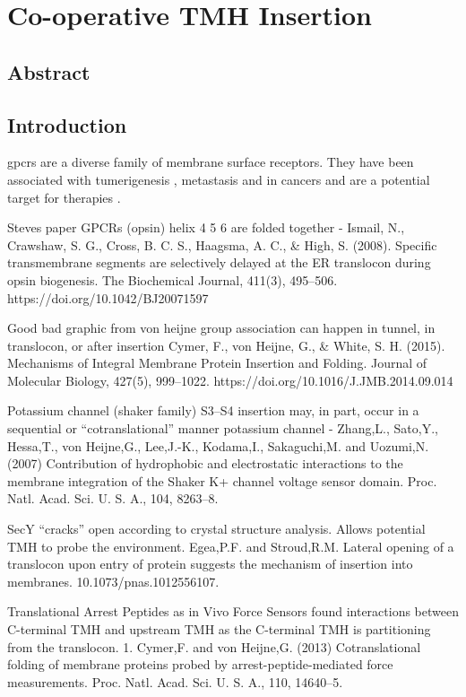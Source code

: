 
\chapter{Co-operative TMH Insertion}
\section{Abstract}
\section{Introduction}

\gls{gpcr}s are a diverse family of membrane surface receptors.
They have been associated with tumerigenesis \cite{OHayre2013}, metastasis \cite{Singh2015} and in cancers \cite{Bar-Shavit2016} and are a potential target for therapies \cite{Arakaki2018}.

Steves paper GPCRs (opsin) helix 4 5 6 are folded together - Ismail, N., Crawshaw, S. G., Cross, B. C. S., Haagsma, A. C., \& High, S. (2008). Specific transmembrane segments are selectively delayed at the ER translocon during opsin biogenesis. The Biochemical Journal, 411(3), 495–506. https://doi.org/10.1042/BJ20071597

Good bad graphic from von heijne group association can happen in tunnel, in translocon, or after insertion Cymer, F., von  Heijne, G., \& White, S. H. (2015). Mechanisms of Integral Membrane Protein Insertion and Folding. Journal of Molecular Biology, 427(5), 999–1022. https://doi.org/10.1016/J.JMB.2014.09.014

Potassium channel (shaker family) S3–S4 insertion may, in part, occur in a sequential or “cotranslational” manner potassium channel - Zhang,L., Sato,Y., Hessa,T., von Heijne,G., Lee,J.-K., Kodama,I., Sakaguchi,M. and Uozumi,N. (2007) Contribution of hydrophobic and electrostatic interactions to the membrane integration of the Shaker K+ channel voltage sensor domain. Proc. Natl. Acad. Sci. U. S. A., 104, 8263–8.

SecY “cracks” open according to crystal structure analysis. Allows potential TMH to probe the environment. Egea,P.F. and Stroud,R.M. Lateral opening of a translocon upon entry of protein suggests the mechanism of insertion into membranes. 10.1073/pnas.1012556107.

Translational Arrest Peptides as in Vivo Force Sensors found interactions between C-terminal TMH and upstream TMH as the C-terminal TMH is partitioning from the translocon. 1. Cymer,F. and von Heijne,G. (2013) Cotranslational folding of membrane proteins probed by arrest-peptide-mediated force measurements. Proc. Natl. Acad. Sci. U. S. A., 110, 14640–5.

